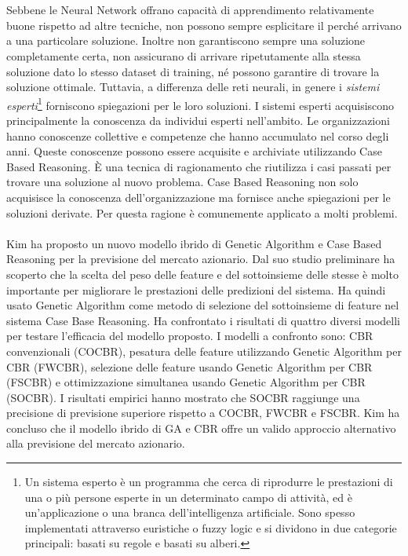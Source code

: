 \documentclass[a4paper,12pt]{report}
\begin{document}
\\~\\Sebbene le Neural Network offrano capacità di apprendimento relativamente buone rispetto ad altre tecniche, non possono sempre esplicitare il perché arrivano a una particolare soluzione. Inoltre non garantiscono sempre una soluzione completamente certa, non assicurano di arrivare ripetutamente alla stessa soluzione dato lo stesso dataset di training, né possono garantire di trovare la soluzione ottimale\cite{40}. Tuttavia, a differenza delle reti neurali, in genere i \textit{sistemi esperti}\footnote{Un sistema esperto è un programma che cerca di riprodurre le prestazioni di una o più persone esperte in un determinato campo di attività, ed è un'applicazione o una branca dell'intelligenza artificiale. Sono spesso implementati attraverso euristiche o fuzzy logic e si dividono in due categorie principali: basati su regole e basati su alberi.} forniscono spiegazioni per le loro soluzioni. I sistemi esperti acquisiscono principalmente la conoscenza da individui esperti nell'ambito. Le organizzazioni hanno conoscenze collettive e competenze che hanno accumulato nel corso degli anni. Queste conoscenze possono essere acquisite e archiviate utilizzando Case Based Reasoning. È una tecnica di ragionamento che riutilizza i casi passati per trovare una soluzione al nuovo problema. Case Based Reasoning non solo acquisisce la conoscenza dell'organizzazione ma fornisce anche spiegazioni per le soluzioni derivate. Per questa ragione è comunemente applicato a molti problemi.\\~\\ Kim \cite{17} ha proposto un nuovo modello ibrido di Genetic Algorithm e Case Based Reasoning per la previsione del mercato azionario. Dal suo studio preliminare ha scoperto che la scelta del peso delle feature e del sottoinsieme delle stesse è molto importante per migliorare le prestazioni delle predizioni del sistema. Ha quindi usato Genetic Algorithm come metodo di selezione del sottoinsieme di feature nel sistema Case Base Reasoning. Ha confrontato i risultati di quattro diversi modelli per testare l'efficacia del modello proposto. I modelli a confronto sono: CBR convenzionali (COCBR), pesatura delle feature utilizzando Genetic Algorithm per CBR (FWCBR), selezione delle feature usando Genetic Algorithm per CBR (FSCBR) e ottimizzazione simultanea usando Genetic Algorithm per CBR (SOCBR). I risultati empirici hanno mostrato che SOCBR raggiunge una precisione di previsione superiore rispetto a COCBR, FWCBR e FSCBR. Kim ha concluso che il modello ibrido di GA e CBR offre un valido approccio alternativo alla previsione del mercato azionario.
\end{document}
